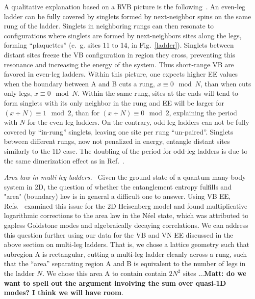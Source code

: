 \documentclass[prl,aps,twocolumn,floatfix,amsmath,amssymb,superscriptaddress,tightenlines]{revtex4}
\begin{document}
A qualitative explanation based on a RVB picture is the
following~\cite{White1994}. An even-leg ladder can be fully covered by
singlets formed by next-neighbor spins on the same rung of the ladder.
Singlets in neighboring rungs can then resonate to configurations where
singlets are formed by next-neighbors sites along the legs, forming
``plaquettes'' (e.~g. sites 11 to 14, in Fig.~\ref{ladder}). Singlets
between distant sites freeze the VB configuration in region they cross,
preventing
this resonance and increasing the energy of the system.  Thus short-range
VB are favored in even-leg ladders.  Within this picture, one expects
higher EE values when the boundary between A and B cuts a rung, $x\equiv0
\mod{N}$, than when cuts only legs, $x\equiv0 \mod{N}$.  Within the same
rung, sites at the ends will tend to form singlets with its only neighbor
in the rung and EE will be larger for $(x\div N) \equiv 1 \mod{2}$, than
for $(x\div N) \equiv 0 \mod{2}$, explaining the period with $N$ for the
even-leg ladders. On the contrary, odd-leg ladders can not be fully
covered by ``in-rung'' singlets, leaving one site per rung ``un-paired''.
Singlets between different rungs, now not penalized in energy, entangle
distant sites similarly to the 1D case. The doubling of the period
for odd-leg ladders is due to the same dimerization effect as in
Ref.~\cite{Ian1}.
 
{\it Area law in multi-leg ladders.}--  
Given the ground state of a
quantum many-body system in 2D, the question of whether the entanglement
entropy fulfills and "area" (boundary) law is in general a difficult one
to answer.  
Using VB EE, Refs.~\cite{Alet,Chh} examined this issue for the 2D Heisenberg model and found
multiplicative logarithmic corrections to the area law in the N\'eel
state, which was attributed to gapless Goldstone modes and
algebraically decaying correlations.  
We can address this question further using our data for the VB and VN EE discussed 
in the above section on multi-leg ladders.  That is, we chose a lattice
geometry such that subregion A is rectangular, cutting a multi-leg ladder
cleanly across a rung, such that the ``area'' separating region A and B is
equivalent to the number of legs in the ladder $N$.  We chose this area A
to contain contain $2N^2$ sites ...{\bf Matt: do we want to spell out the
argument involving the sum over quasi-1D modes?  I think we will have
room}.
\end{document}
